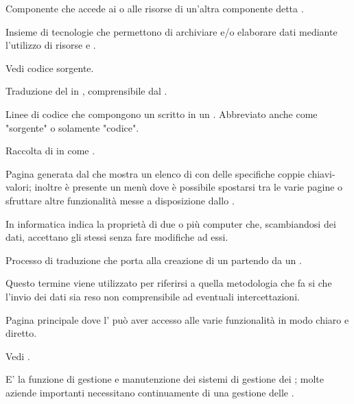 {Componente che accede ai  o alle risorse di un'altra componente detta .} 

{Insieme di tecnologie che permettono di archiviare e/o elaborare dati mediante l'utilizzo di risorse  e  .}

{Vedi codice sorgente.}


{Traduzione del  in , comprensibile dal .}


{Linee di codice che compongono un  scritto in un . Abbreviato anche come "sorgente" o solamente "codice".}


{Raccolta di  in  come .}


{Pagina generata dal   che mostra un elenco di  con delle specifiche coppie chiavi-valori; inoltre è presente un menù dove è possibile spostarsi tra le varie pagine  o sfruttare altre funzionalità messe a disposizione dallo .}


{In informatica indica la proprietà di due o più computer che, scambiandosi dei dati, accettano gli stessi  senza fare modifiche ad essi.}


{Processo di traduzione che porta alla creazione di un  partendo da un .}


{Questo termine viene utilizzato per riferirsi a quella metodologia che fa si che l'invio dei dati sia reso non comprensibile ad eventuali intercettazioni.}



{Pagina principale dove l' può aver accesso alle varie funzionalità in modo chiaro e diretto.}


{Vedi .}


{E' la funzione di gestione e manutenzione dei sistemi di gestione dei ; molte aziende importanti necessitano continuamente di una gestione delle .}


